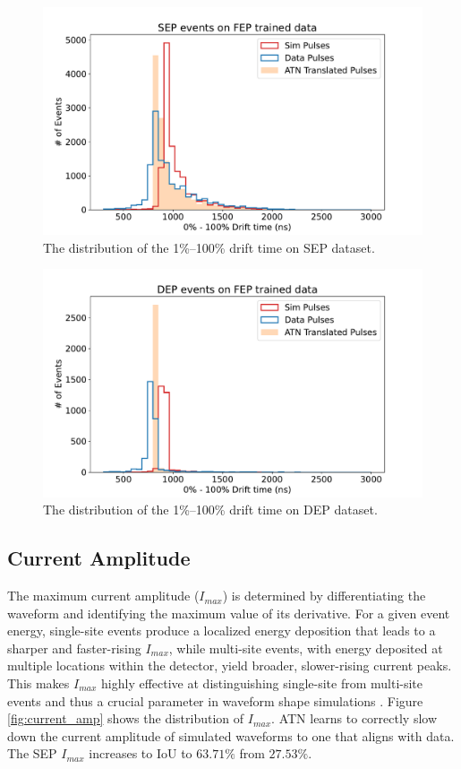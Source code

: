\begin{figure}[htb!]
\centering
\includegraphics[width=0.99\linewidth,trim={0pc 0pc 0pc 0pc},clip]{ch8/figs/sep_drift_time.pdf}
\caption{The distribution of the 1\%–100\% drift time on SEP dataset.}
\label{fig:drift_times_sep}
\end{figure}

\begin{figure}[htb!]
\centering
\includegraphics[width=0.95\linewidth,trim={0pc 0pc 0pc 0pc},clip]{ch8/figs/dep_drift_time.pdf}
\caption{The distribution of the 1\%–100\% drift time on DEP dataset.}
\label{fig:drift_times_dep}
\end{figure}

\subsection{Current Amplitude}

The maximum current amplitude ($I_{max}$) is determined by differentiating the waveform and identifying the maximum value of its derivative. For a given event energy, single-site events produce a localized energy deposition that leads to a sharper and faster-rising $I_{max}$, while multi-site events, with energy deposited at multiple locations within the detector, yield broader, slower-rising current peaks. This makes $I_{max}$ highly effective at distinguishing single-site from multi-site events and thus a crucial parameter in waveform shape simulations \cite{mjd_psd}. Figure \ref{fig:current_amp} shows the distribution of $I_{max}$.  ATN learns to correctly slow down the current amplitude of simulated waveforms to one that aligns with data. The SEP $I_{max}$ increases to IoU to $63.71\%$ from $27.53\%$.
  
